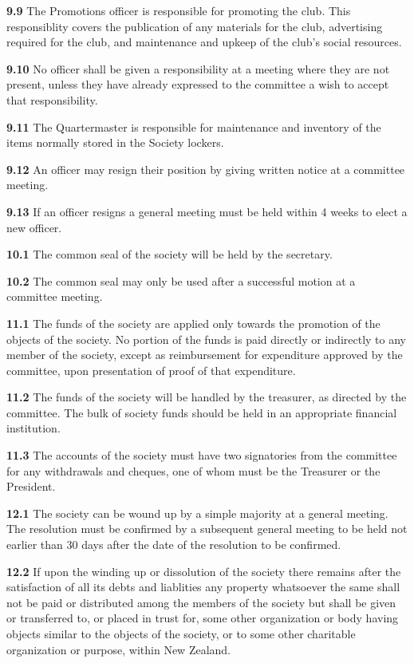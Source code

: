 \textbf{9.9} The Promotions officer is responsible for promoting the club. This responsiblity covers the publication of any materials for the club, advertising required for the club, and maintenance and upkeep of the club's social resources.


\textbf{9.10} No officer shall be given a responsibility at a meeting where they are not present, unless they have already expressed to the committee a wish to accept that responsibility.

\textbf{9.11} The Quartermaster is responsible for maintenance and inventory of the items normally stored in the Society lockers.

\textbf{9.12} An officer may resign their position by giving written notice at a committee meeting. 

\textbf{9.13} If an officer resigns a general meeting must be held within 4 weeks to elect a new officer.

\vspace{1em}

\textbf{10.1} The common seal of the society will be held by the secretary.

\textbf{10.2} The common seal may only be used after a successful motion at a committee meeting.

\vspace{1em}

\textbf{11.1} The funds of the society are applied only towards the promotion of the objects of the society. No portion of the funds is paid directly or indirectly to any member of the society, except as reimbursement for expenditure approved by the committee, upon presentation of proof of that expenditure.

\textbf{11.2} The funds of the society will be handled by the treasurer, as directed by the committee. The bulk of society funds should be held in an appropriate financial institution. 

\textbf{11.3} The accounts of the society must have two signatories from the committee for any withdrawals and cheques, one of whom must be the Treasurer or the President.

\vspace{1em}

\textbf{12.1} The society can be wound up by a simple majority at a general meeting. The resolution must be confirmed by a subsequent general meeting to be held not earlier than 30 days after the date of the resolution to be confirmed.

\textbf{12.2} If upon the winding up or dissolution of the society there remains after the satisfaction of all its debts and liablities any property whatsoever the same shall not be paid or distributed among the members of the society but shall be given or transferred to, or placed in trust for, some other organization or body having objects similar to the objects of the society, or to some other charitable organization or purpose, within New Zealand.

